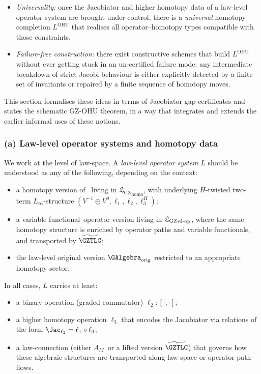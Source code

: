 \documentclass[11pt]{book}
\theoremstyle{plain}
\theoremstyle{definition}
\newcommand{\GZLS}{\ensuremath{\mathfrak{L}_{\mathrm{GZ}}}}       \newcommand{\GZLT}{\ensuremath{M_{!w}}}                           \newcommand{\GZLOC}{\ensuremath{A_M}}                             \newcommand{\GZLCurv}{\ensuremath{\mathcal{F}_{\mathrm{law}}}}
\begin{document}
\begin{itemize}
  \item \emph{Universality:} once the Jacobiator and higher homotopy
        data of a law-level operator system are brought under control,
        there is a \emph{universal} homotopy completion
        $L^{\mathrm{OHU}}$ that realises all operator--homotopy types
        compatible with those constraints.
  \item \emph{Failure-free construction:} there exist constructive
        schemes that build $L^{\mathrm{OHU}}$ without ever getting
        stuck in an un-certified failure mode: any intermediate
        breakdown of strict Jacobi behaviour is either explicitly
        detected by a finite set of invariants or repaired by a finite
        sequence of homotopy moves.
\end{itemize}

This section formalises these ideas in terms of Jacobiator-gap
certificates and states the schematic GZ-OHU theorem, in a way that
integrates and extends the earlier informal uses of these notions.

\subsubsection*{(a) Law-level operator systems and homotopy data}

We work at the level of law-space. A \emph{law-level operator system}
$L$ should be understood as any of the following, depending on the
context:

\begin{itemize}
  \item a homotopy version of \GAlgebra\ living in
        ${\GZLS}_{\mathrm{homo}}$, with underlying
        $H$-twisted two-term $L_\infty$-structure
        $(V^{-1}\oplus V^0,\ell_1,\ell_2,\ell_3^H)$;
  \item a variable functional--operator version living in
        ${\GZLS}_{\mathrm{vf\text- op}}$, where the same homotopy
        structure is enriched by operator paths and variable
        functionals, and transported by $\widetilde{\GZTLC}$;
  \item the law-level original version $\GAlgebra_{\mathrm{orig}}$
        restricted to an appropriate homotopy sector.
\end{itemize}

In all cases, $L$ carries at least:

\begin{itemize}
  \item a binary operation (graded commutator)
        $\ell_2:[\cdot,\cdot]$;
  \item a higher homotopy operation $\ell_3$ that encodes the
        Jacobiator via relations of the form
        $\Jac_{\ell_2} = \ell_1\circ\ell_3$;
  \item a law-connection (either \GZLOC\ or a lifted version
        $\widetilde{\GZTLC}$) that governs how these algebraic
        structures are transported along law-space or operator-path
        flows.
\end{itemize}
\end{document}
